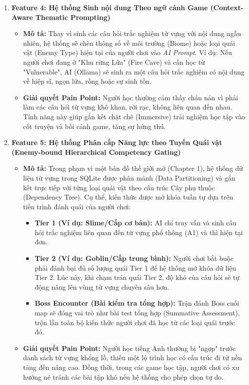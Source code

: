 \begin{enumerate}
\begin{itemize}
		\item \textbf{Giải quyết Pain Point:} Khắc phục triệt để "đường cong quên lãng" (Ebbinghaus forgetting curve). Tối ưu hóa thời gian học bằng cách cá nhân hóa 100\% lộ trình: chỉ học những gì mình chưa biết hoặc hay làm sai.
	\end{itemize}
	\item \textbf{Feature 4: Hệ thống Sinh nội dung Theo ngữ cảnh Game (Context-Aware Thematic Prompting)}
	\begin{itemize}
		\item \textbf{Mô tả:} Thay vì sinh các câu hỏi trắc nghiệm từ vựng với nội dung ngẫu nhiên, hệ thống sẽ chèn thông số về môi trường (Biome) hoặc loại quái vật (Enemy Type) hiện tại của người chơi vào \textit{AI Prompt}. Ví dụ: Nếu người chơi đang ở "Khu rừng Lửa" (Fire Cave) và cần học từ "Vulnerable", AI (Ollama) sẽ sinh ra một câu hỏi trắc nghiệm có nội dung về hiệp sĩ, ngọn lửa, rồng hoặc sự sinh tồn.
		\item \textbf{Giải quyết Pain Point:} Người học thường cảm thấy chán nản vì phải làm các câu hỏi từ vựng khô khan, rời rạc, không liên quan đến nhau. Tính năng này giúp gắn kết chặt chẽ (Immersive) trải nghiệm học tập vào cốt truyện và bối cảnh game, tăng sự hứng thú.
	\end{itemize}
	
	\item \textbf{Feature 5: Hệ thống Phân cấp Năng lực theo Tuyến Quái vật (Enemy-bound Hierarchical Competency Gating)}
	\begin{itemize}
		\item \textbf{Mô tả:} Trong phạm vi một bản đồ thế giới mở (Chapter 1), hệ thống dữ liệu từ vựng trong SQLite được phân mảnh (Data Partitioning) và gắn kết trực tiếp với từng loại quái vật theo cấu trúc Cây phụ thuộc (Dependency Tree). Cụ thể, kiến thức được mở khóa tuần tự dựa trên tiến trình đánh quái của người chơi:
		\begin{itemize}
			\item \textbf{Tier 1 (Ví dụ: Slime/Cấp cơ bản):} AI chỉ truy vấn và sinh câu hỏi trắc nghiệm liên quan đến từ vựng phổ thông (A1) và thì hiện tại đơn.
			\item \textbf{Tier 2 (Ví dụ: Goblin/Cấp trung bình):} Người chơi bắt buộc phải đánh bại đủ số lượng quái Tier 1 để hệ thống mở khóa dữ liệu Tier 2. Lúc này, khi chạm trán quái Tier 2, độ khó của câu hỏi sẽ tự động nâng lên vùng từ vựng chuyên sâu hơn.
			\item \textbf{Boss Encounter (Bài kiểm tra tổng hợp):} Trận đánh Boss cuối map sẽ đóng vai trò như bài test tổng hợp (Summative Assessment), trộn lẫn toàn bộ kiến thức người chơi đã học từ các loại quái trước đó.
		\end{itemize}
		\item \textbf{Giải quyết Pain Point:} Người học tiếng Anh thường bị "ngợp" trước danh sách từ vựng khổng lồ, thiếu một lộ trình học có cấu trúc đi từ nền tảng đến nâng cao. Đồng thời, trong các game học tập, người chơi có xu hướng né tránh các bài tập khó nếu hệ thống cho phép chọn tự do. 


\end{itemize}
\end{enumerate}
